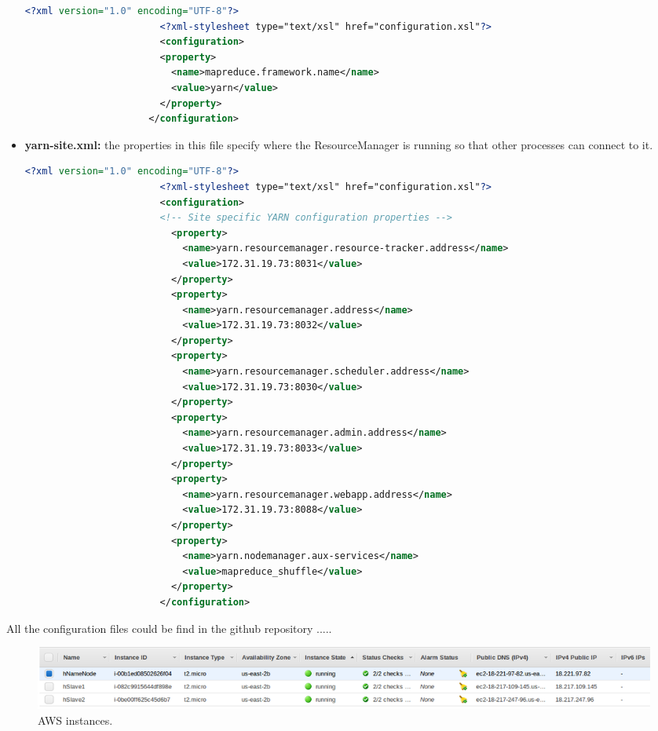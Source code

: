 \documentclass{article}
\newcommand*\setcaptioncitation[1]{\def\captioncitation{\textit{Source:}~#1}}
\let\captioncitation\relax
\begin{document}
\begin{itemize}
                    \begin{lstlisting}[language=XML, caption= mapred-site.xml, label={lst:mapred}]
                        <?xml version="1.0" encoding="UTF-8"?>
                        <?xml-stylesheet type="text/xsl" href="configuration.xsl"?>
                        <configuration>
                        <property>
                          <name>mapreduce.framework.name</name>
                          <value>yarn</value>
                        </property>
                      </configuration>                      
                \end{lstlisting}
                \item \textbf{yarn-site.xml:} the properties in this file specify where the ResourceManager is running so that other processes can connect to it.
                    \begin{lstlisting}[language=XML, caption= yarn-site.xml, label={lst:yarn}]
                        <?xml version="1.0" encoding="UTF-8"?>
                        <?xml-stylesheet type="text/xsl" href="configuration.xsl"?>
                        <configuration>
                        <!-- Site specific YARN configuration properties -->
                          <property>
                            <name>yarn.resourcemanager.resource-tracker.address</name>
                            <value>172.31.19.73:8031</value>
                          </property>
                          <property>
                            <name>yarn.resourcemanager.address</name>
                            <value>172.31.19.73:8032</value>
                          </property>
                          <property>
                            <name>yarn.resourcemanager.scheduler.address</name>
                            <value>172.31.19.73:8030</value>
                          </property>
                          <property>
                            <name>yarn.resourcemanager.admin.address</name>
                            <value>172.31.19.73:8033</value>
                          </property>
                          <property>
                            <name>yarn.resourcemanager.webapp.address</name>
                            <value>172.31.19.73:8088</value>
                          </property>
                          <property>
                            <name>yarn.nodemanager.aux‐services</name>
                            <value>mapreduce_shuffle</value>
                          </property>
                        </configuration>                     
                \end{lstlisting}
            \end{itemize}
        All the configuration files could be find in the github repository .....
        \begin{figure}[H]
            \centering 
            \includegraphics[width=1\linewidth]{./img/instances.png}
            \setcaptioncitation{Screenshot idk.}
            \caption{AWS instances.}
            \label{fig:instances}
        \end{figure}
\end{document}
